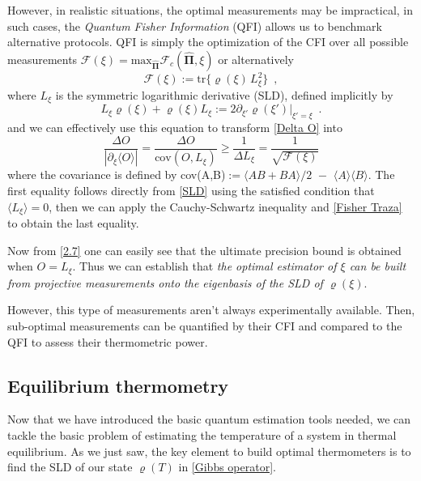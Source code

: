 However, in realistic situations, the optimal measurements may be impractical, in such cases, the \textit{Quantum Fisher Information} (QFI) allows us to benchmark alternative protocols. QFI is simply the optimization of the CFI over all possible measurements $\mathcal{F}(\xi) =\text{max}_{\mathbf{\widehat{\Pi}}}\mathcal{F}_c(\mathbf{\widehat{\Pi}},\xi)$ or alternatively \cite{QuantumStatisticalInference}
\begin{equation}\label{Fisher Traza}
    \mathcal{F}(\xi) := \text{tr}\{{\varrho}(\xi)\,{L}^2_\xi\}\,\,\,,
\end{equation}
where ${L}_\xi$ is the symmetric logarithmic derivative (SLD), defined implicitly by
\begin{equation}
    {L}_\xi {\varrho}(\xi) + {\varrho}(\xi) {L}_\xi := 2 \partial_{\xi'} {\varrho}(\xi') \big|_{\xi'=\xi}\,\,\,.
    \label{SLD}
\end{equation}
and we can effectively use this equation to transform \eqref{Delta O} into
\begin{equation}\label{2.7}
\frac{\Delta {O}}{|\partial_{\xi}\langle {O} \rangle|} = \frac{\Delta {O}}{\text{cov}({O}, {L}_{\xi})} \geq \frac{1}{\Delta {L}_{\xi}} = \frac{1}{\sqrt{\mathcal{F}(\xi)}}
\end{equation}
where the covariance is defined by cov(A,B)$:=\langle AB + BA\rangle/2\,\,-\,\,\langle A\rangle \langle B\rangle$. The first equality follows directly from \eqref{SLD} using the satisfied condition that $\langle{L}_\xi\rangle = 0$, then we can apply the Cauchy-Schwartz inequality and \eqref{Fisher Traza} to obtain the last equality.

Now from \eqref{2.7} one can easily see that the ultimate precision bound is obtained when ${O}={L}_\xi$. Thus we can establish that \emph{the optimal estimator of $\xi$ can be built from projective measurements onto the eigenbasis of the SLD of $\varrho(\xi)$}.

However, this type of measurements aren't always experimentally available. Then, sub-optimal measurements can be quantified by their CFI and compared to the QFI to assess their thermometric power.

\subsection{Equilibrium thermometry}\label{Equilibrium thermometers}
Now that we have introduced the basic quantum estimation tools needed, we can tackle the basic problem of estimating the temperature of a system in thermal equilibrium. As we just saw, the key element to build optimal thermometers is to find the SLD of our state ${\varrho}(T)$ in \eqref{Gibbs operator}.

